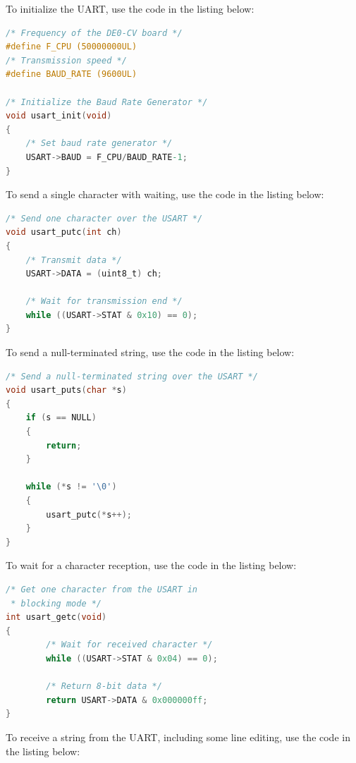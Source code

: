 \documentclass[12pt]{article}
\begin{document}
To initialize the UART, use the code in the listing below:

\begin{lstlisting}[language=C]
/* Frequency of the DE0-CV board */
#define F_CPU (50000000UL)
/* Transmission speed */
#define BAUD_RATE (9600UL)

/* Initialize the Baud Rate Generator */
void usart_init(void)
{
    /* Set baud rate generator */
    USART->BAUD = F_CPU/BAUD_RATE-1;
}
\end{lstlisting}

To send a single character with waiting, use the code in the listing below:

\begin{lstlisting}[language=C]
/* Send one character over the USART */
void usart_putc(int ch)
{
    /* Transmit data */
    USART->DATA = (uint8_t) ch;
            
    /* Wait for transmission end */
    while ((USART->STAT & 0x10) == 0);
}
\end{lstlisting}

To send a null-terminated string, use the code in the listing below:

\begin{lstlisting}[language=C]
/* Send a null-terminated string over the USART */
void usart_puts(char *s)
{
    if (s == NULL)
    {
        return;
    }

    while (*s != '\0')
    {
        usart_putc(*s++);
    }
}
\end{lstlisting}

To wait for a character reception, use the code in the listing below:

\begin{lstlisting}[language=C]
/* Get one character from the USART in
 * blocking mode */
int usart_getc(void)
{
        /* Wait for received character */
        while ((USART->STAT & 0x04) == 0);

        /* Return 8-bit data */
        return USART->DATA & 0x000000ff;
}
\end{lstlisting}

To receive a string from the UART, including some line editing, use the code in the listing below:
\end{document}
